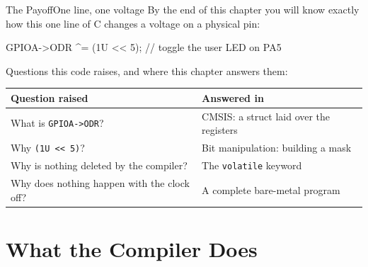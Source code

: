 \documentclass[9pt,aspectratio=169,xcolor=table]{beamer}
\begin{document}
{\beamerextras
\begin{frame}[fragile]{The Payoff}{One line, one voltage}
    \leavevmode
    By the end of this chapter you will know \alert{exactly} how this one line of C changes a voltage on a physical pin:

    \vspace{2mm}
    \begin{center}
    \begin{minipage}{.9\textwidth}
\begin{cc}[basicstyle=\ttfamily\small]
GPIOA->ODR ^= (1U << 5);    // toggle the user LED on PA5
\end{cc}
    \end{minipage}
    \end{center}

    \vspace{2mm}
    {\small Questions this code raises, and where this chapter answers them:}

    \vspace{1mm}
    \begin{center}
    {\small
    \striped
    \begin{tabular}{@{}l R{.52\textwidth}@{}}
        \toprule
        \textbf{Question raised} & \textbf{Answered in} \\
        \midrule
        What is \texttt{GPIOA->ODR}? & CMSIS: a struct laid over the registers \\
        Why \texttt{(1U << 5)}? & Bit manipulation: building a mask \\
        Why is nothing deleted by the compiler? & The \texttt{volatile} keyword \\
        Why does nothing happen with the clock off? & A complete bare-metal program \\
        \bottomrule
    \end{tabular}}
    \end{center}
\end{frame}
}


\section{What the Compiler Does}
\end{document}
